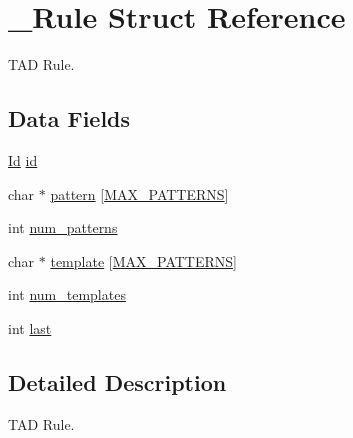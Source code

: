 \hypertarget{struct___rule}{\section{\+\_\+\+Rule Struct Reference}
\label{struct___rule}
}


T\+A\+D Rule.  


\subsection*{Data Fields}
\begin{DoxyCompactItemize}
\item 
\hyperlink{_types_8h_a845e604fb28f7e3d97549da3448149d3}{Id} \hyperlink{struct___rule_a150a709e86e7134d17cd063de6810b6c}{id}
\item 
char $\ast$ \hyperlink{struct___rule_a3d55cafd916ba96e438b8092d299c250}{pattern} \mbox{[}\hyperlink{_reglas__dialogo_8h_a24c48ef77929deff9e40e141a891dbb8}{M\+A\+X\+\_\+\+P\+A\+T\+T\+E\+R\+N\+S}\mbox{]}
\item 
int \hyperlink{struct___rule_a70421908d9d75967f3e5fb47527a5cef}{num\+\_\+patterns}
\item 
char $\ast$ \hyperlink{struct___rule_a93415ea39c3f89a4501aa6bf1a1d4c35}{template} \mbox{[}\hyperlink{_reglas__dialogo_8h_a24c48ef77929deff9e40e141a891dbb8}{M\+A\+X\+\_\+\+P\+A\+T\+T\+E\+R\+N\+S}\mbox{]}
\item 
int \hyperlink{struct___rule_abd6968f15e4cadc35682bd9661dbc2c9}{num\+\_\+templates}
\item 
int \hyperlink{struct___rule_a72e27dee31b1c4c6a504fbed29542d97}{last}
\end{DoxyCompactItemize}


\subsection{Detailed Description}
T\+A\+D Rule. 


\begin{DoxyItemize}
\item 
\end{DoxyItemize}

